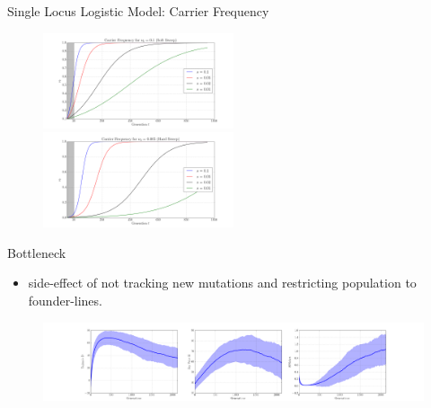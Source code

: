 \documentclass[t]{beamer} %
\begin{document}
\begin{frame}{Single Locus Logistic Model: Carrier Frequency}

\begin{figure}
\centering
\hspace{-0in}\includegraphics[trim={2in 0.5in 1.5in 0in},clip,page=2,width=0.5\textwidth]{sigmoidSoft}
\hspace{-0in}\includegraphics[trim={2in 0.5in 1.9in 0in},clip,page=2,width=0.5\textwidth]{sigmoidHard}
\end{figure}
\end{frame}

\begin{frame}{Bottleneck}
\begin{itemize}
	\item side-effect of not tracking new mutations and restricting population 
	to founder-lines.
\end{itemize}
\begin{figure}
\centering
\includegraphics[trim=2in 0 2in 0, clip,width=\textwidth]{bottleneck}
\end{figure}

\end{frame}
\end{document}
